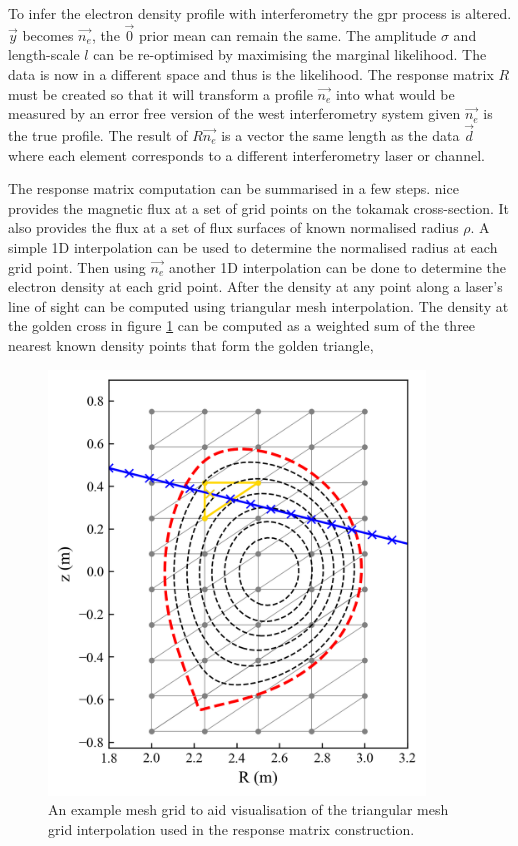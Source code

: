 To infer the electron density profile with interferometry the \gls{gpr} process is altered. $\vec{y}$ becomes $\vec{n_e}$, the $\vec{0}$ prior mean can remain the same. The amplitude $\sigma$ and length-scale $l$ can be re-optimised by maximising the marginal likelihood. The data is now in a different space and thus is the likelihood. The response matrix $R$ must be created so that it will transform a profile $\vec{n_e}$ into what would be measured by an error free version of the \gls{west} interferometry system given $\vec{n_e}$ is the true profile. The result of $R \vec{n_e}$ is a vector the same length as the data $\vec{d}$ where each element corresponds to a different interferometry laser or channel. 

The response matrix computation can be summarised in a few steps. \Gls{nice} provides the magnetic flux at a set of grid points on the tokamak cross-section. It also provides the flux at a set of flux surfaces of known normalised radius $\rho$. A simple 1D interpolation can be used to determine the normalised radius at each grid point. Then using $\vec{n_e}$ another 1D interpolation can be done to determine the electron density at each grid point. After the density at any point along a laser's line of sight can be computed using triangular mesh interpolation. The density at the golden cross in figure \ref{fig:meshtriangle} can be computed as a weighted sum of the three nearest known density points that form the golden triangle,

\begin{figure}
  \centering
  \includegraphics[width=10cm]{images/meshtriangle.png}
  \caption{An example mesh grid to aid visualisation of the triangular mesh grid interpolation used in the response matrix construction.}
  \label{fig:meshtriangle}
\end{figure}

